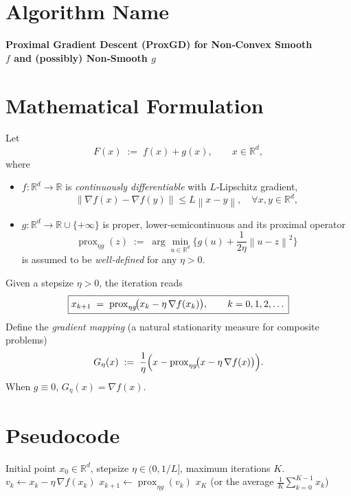 \documentclass{article}
\newcommand{\prox}{\operatorname{prox}}
\newcommand{\grad}{\nabla}
\newcommand{\norm}[1]{\left\lVert #1\right\rVert}
\newcommand{\R}{\mathbb{R}}
\begin{document}
\section*{Algorithm Name}
\textbf{Proximal Gradient Descent (ProxGD) for Non‑Convex Smooth \\ $f$ and (possibly) Non‑Smooth $g$}

\section*{Mathematical Formulation}
Let 
\[
F(x) \;:=\; f(x)+g(x),\qquad x\in\R^{d},
\]
where 
\begin{itemize}
    \item $f:\R^{d}\to\R$ is \emph{continuously differentiable} with $L$‑Lipschitz gradient,
          \[
          \norm{\grad f(x)-\grad f(y)}\le L\norm{x-y},\quad\forall x,y\in\R^{d},
          \]
    \item $g:\R^{d}\to\R\cup\{+\infty\}$ is proper, lower‑semicontinuous and its proximal operator
          \[
          \prox_{\eta g}(z)\;:=\;\arg\min_{u\in\R^{d}}\Big\{ g(u)+\frac{1}{2\eta}\norm{u-z}^{2}\Big\}
          \]
          is assumed to be \emph{well‑defined} for any $\eta>0$.
\end{itemize}
Given a stepsize $\eta>0$, the iteration reads
\begin{equation}
\boxed{%
x_{k+1}\;=\;\prox_{\eta g}\!\bigl(x_{k}-\eta\,\grad f(x_{k})\bigr),\qquad k=0,1,2,\dots
}
\label{eq:update}
\end{equation}
Define the \emph{gradient mapping} (a natural stationarity measure for composite problems)
\begin{equation}
G_{\eta}(x)\;:=\;\frac{1}{\eta}\Bigl(x-\prox_{\eta g}\!\bigl(x-\eta\,\grad f(x)\bigr)\Bigr).
\label{eq:gradmap}
\end{equation}
When $g\equiv0$, $G_{\eta}(x)=\grad f(x)$.  

\section*{Pseudocode}
\begin{algorithm}[H]
\caption{Proximal Gradient Descent}
\begin{algorithmic}[1]
\Require Initial point $x_{0}\in\R^{d}$, stepsize $\eta\in(0,1/L]$, maximum iterations $K$.
    \State $v_{k}\gets x_{k}-\eta\,\grad f(x_{k})$ 
    \State $x_{k+1}\gets \prox_{\eta g}(v_{k})$ 
\EndFor
\State \Return $x_{K}$ (or the average $\frac1K\sum_{k=0}^{K-1}x_{k}$)
\end{algorithmic}
\end{algorithm}
\end{document}

